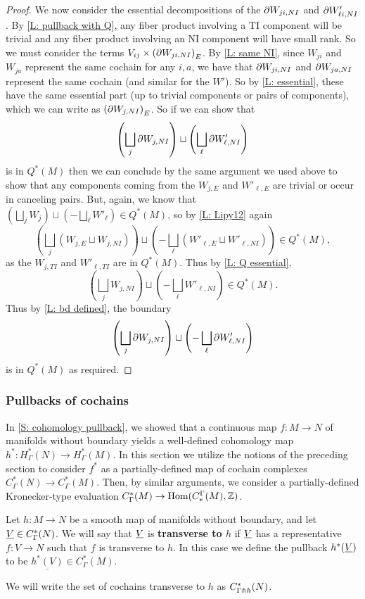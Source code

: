 \begin{proof}
	We now consider the essential decompositions of the $\partial W_{ji,NI}$ and $\partial W'_{\ell i,NI}$.
	By \cref{L: pullback with Q}, any fiber product involving a TI component will be trivial and any fiber product involving an NI component will have small rank.
	So we must consider the terms $V_{ij} \times \left(\partial W_{ji,NI}\right)_E$.
	By \cref{L: same NI}, since $W_{ji}$ and $W_{ja}$ represent the same cochain for any $i,a$, we have that $\partial W_{ji,NI}$ and $\partial W_{ja,NI}$ represent the same cochain (and similar for the $W'$).
	So by \cref{L: essential}, these have the same essential part (up to trivial components or pairs of components), which we can write as $\left(\partial W_{j,NI}\right)_E$.
	So if we can show that
	$$\left(\bigsqcup_j \partial W_{j,NI}\right) \sqcup \left(\bigsqcup_\ell \partial W'_{\ell,NI}\right)$$
	is in $Q^*(M)$ then we can conclude by the same argument we used above to show that any components coming from the $W_{j,E}$ and $W'_{\ell,E}$ are trivial or occur in canceling pairs.
	But, again, we know that
	$(\bigsqcup_j W_{j}) \sqcup (-\bigsqcup_\ell W'_{\ell}) \in Q^*(M)$, so by \cref{L: Lipy12} again
	$$\left(\bigsqcup_j \left(W_{j,E} \sqcup W_{j,NI}\right)\right) \sqcup \left(-\bigsqcup_\ell \left(W'_{\ell,E} \sqcup W'_{\ell,NI}\right)\right) \in Q^*(M),$$
	as the $W_{j,TI}$ and $W'_{\ell, TI}$ are in $Q^*(M)$.
	Thus by \cref{L: Q essential}, $$\left(\bigsqcup_j W_{j,NI}\right) \sqcup \left(-\bigsqcup_\ell W'_{\ell,NI}\right) \in Q^*(M).$$ Thus by \cref{L: bd defined}, the boundary
	$$\left(\bigsqcup_j \partial W_{j,NI}\right) \sqcup \left(-\bigsqcup_\ell \partial W'_{\ell,NI}\right)$$ is in $Q^*(M)$
	as required.
\end{proof}

\subsubsection{Pullbacks of cochains}\label{S: product pullbacks}

In \cref{S: cohomology pullback}, we showed that a continuous map $f \colon M \to N$ of manifolds without boundary yields a well-defined cohomology map $h^* \colon H^*_\Gamma(N) \to H^*_\Gamma(M)$.
In this section we utilize the notions of the preceding section to consider $f^*$ as a partially-defined map of cochain complexes $C^*_\Gamma(N) \to C^*_\Gamma(M)$.
Then, by similar arguments, we consider a partially-defined Kronecker-type evaluation $C^*_\Gamma(M) \to \textup{Hom}(C_*^\Gamma(M),\mathbb{Z})$.


\begin{definition}\label{D: transverse to map}
	Let $h \colon M \to N$ be a smooth map of manifolds without boundary, and let $\underline{V} \in C^*_\Gamma(N)$.
	We will say that $\underline{V}$ is \textbf{transverse to $h$} if $\underline{V}$ has a representative $f \colon V \to N$ such that $f$ is transverse to $h$.
	In this case we define the pullback $h^*(\underline{V})$ to be $\underline{h^*(V)} \in C^*_\Gamma(M)$.

	We will write the set of cochains transverse to $h$ as $C^*_{\Gamma \pitchfork h}(N)$.
\end{definition}

